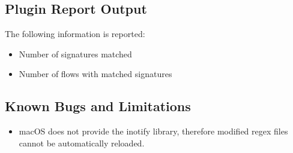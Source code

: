 \documentclass[documentation]{subfiles}
\begin{document}
\subsection{Plugin Report Output}
The following information is reported:
\begin{itemize}
    \item Number of signatures matched
    \item Number of flows with matched signatures
\end{itemize}

\subsection{Known Bugs and Limitations}\label{s:re2-bugs}
\begin{itemize}
    \item macOS does not provide the inotify library, therefore modified regex files cannot be automatically reloaded.
\end{itemize}
\end{document}
